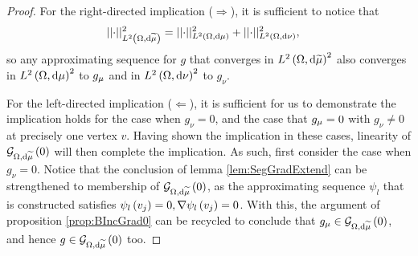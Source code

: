 \begin{proof}
	For the right-directed implication ($\Rightarrow$), it is sufficient to notice that 
	\begin{align*}
		\lvert\lvert \cdot \rvert\rvert_{L^{2}\left( \Omega,\mathrm{d}\widetilde{\mu} \right)}^2 &= \lvert\lvert \cdot \rvert\rvert_{L^{2}\left( \Omega,\mathrm{d}\mu \right)}^2 + \lvert\lvert \cdot \rvert\rvert_{L^{2}\left( \Omega,\mathrm{d}\nu \right)}^2,
	\end{align*}
	so any approximating sequence for $g$ that converges in $L^{2}\left( \Omega,\mathrm{d}\widetilde{\mu} \right)^2$ also converges in $L^{2}\left( \Omega,\mathrm{d}\mu \right)^2$ to $g_{\mu}$ and in $L^{2}\left( \Omega,\mathrm{d}\nu \right)^2$ to $g_{\nu}$.
	
	For the left-directed implication ($\Leftarrow$), it is sufficient for us to demonstrate the implication holds for the case when $g_{\nu}=0$, and the case that $g_{\mu}=0$ with $g_{\nu}\neq0$ at precisely one vertex $v$.
	Having shown the implication in these cases, linearity of $\mathcal{G}_{ \Omega, \mathrm{d}\widetilde{\mu}}\left( 0 \right)$ will then complete the implication.
	As such, first consider the case when $g_{\nu}=0$.
	Notice that the conclusion of lemma \ref{lem:SegGradExtend} can be strengthened to membership of $\mathcal{G}_{ \Omega, \mathrm{d}\widetilde{\mu}}\left( 0 \right)$, as the approximating sequence $\psi_l$ that is constructed satisfies $\psi_l\left( v_j \right)=0, \nabla\psi_l\left( v_j \right)=0$. 
	With this, the argument of proposition \ref{prop:BIncGrad0} can be recycled to conclude that $g_{\mu}\in\mathcal{G}_{ \Omega, \mathrm{d}\widetilde{\mu}}\left( 0 \right)$, and hence $g\in\mathcal{G}_{ \Omega, \mathrm{d}\widetilde{\mu}}\left( 0 \right)$ too.
	

\end{proof}
